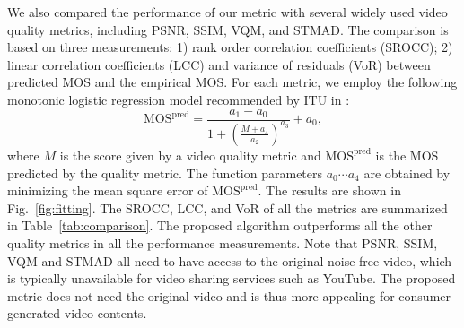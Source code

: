 \documentclass{sig-alternate}
\begin{document}

We also compared the performance of our metric with several widely used video quality metrics, including PSNR, SSIM, VQM, and STMAD. The comparison is based on three measurements: 1) rank order correlation coefficients (SROCC); 2) linear correlation coefficients (LCC) and variance of residuals (VoR) between predicted MOS and the empirical MOS. For each metric, we employ the following monotonic logistic regression model recommended by ITU in \cite{ITUValidation}:
\begin{equation}
\label{eq:regression}
\mathrm{MOS^{pred}} = \frac{a_1-a_0}{1+\left(\frac{M+a_4}{a_2}\right)^{a_3}} + a_0,
\end{equation}
where $M$ is the score given by a video quality metric and $\mathrm{MOS^{pred}}$ is the MOS predicted by the quality metric. The function parameters $a_0\cdots a_4$ are obtained by minimizing the mean square error of $\mathrm{MOS^{pred}}$. The results are shown in Fig.~\ref{fig:fitting}. The SROCC, LCC, and VoR of all the metrics are summarized in Table~\ref{tab:comparison}. The proposed algorithm outperforms all the other quality metrics in all the performance measurements. Note that PSNR, SSIM, VQM and STMAD all need to have access to the original noise-free video, which is typically unavailable for video sharing services such as YouTube. The proposed metric does not need the original video and is thus more appealing for consumer generated video contents.

\begin{table}
\centering
\caption{\label{tab:comparison}Performance comparison with other full-reference quality metrics.}
\end{table} 
\end{document}
